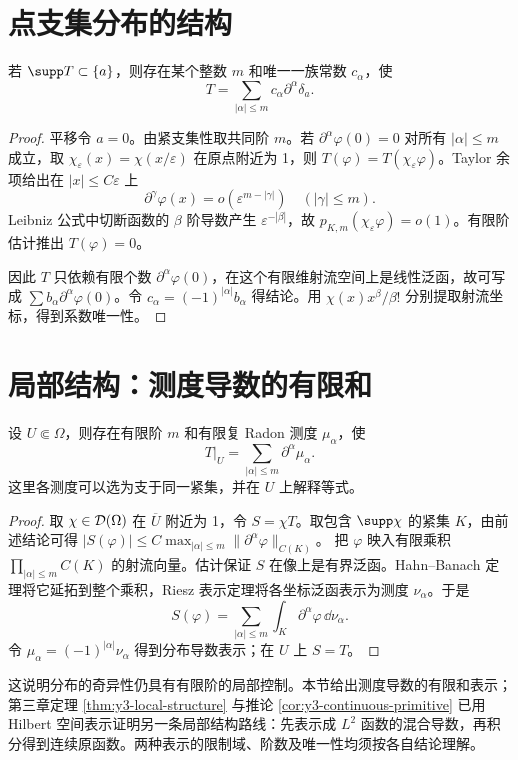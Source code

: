 \section{点支集分布的结构}
\begin{theorem}[有限点射流]\label{thm:point-support}
若 $\supp T\subset\{a\}$，则存在某个整数 $m$ 和唯一一族常数 $c_\alpha$，使
\begin{equation}\label{eq:point-support}
 T=\sum_{|\alpha|\le m}c_\alpha\partial^\alpha\delta_a.
\end{equation}
\end{theorem}
\begin{proof}
平移令 $a=0$。由紧支集性取共同阶 $m$。若 $\partial^\alpha\varphi(0)=0$ 对所有 $|\alpha|\le m$ 成立，取 $\chi_\varepsilon(x)=\chi(x/\varepsilon)$ 在原点附近为 1，则 $T(\varphi)=T(\chi_\varepsilon\varphi)$。Taylor 余项给出在 $|x|\le C\varepsilon$ 上
\[
 \partial^\gamma\varphi(x)=o(\varepsilon^{m-|\gamma|})\quad(|\gamma|\le m).
\]
Leibniz 公式中切断函数的 $\beta$ 阶导数产生 $\varepsilon^{-|\beta|}$，故 $p_{K,m}(\chi_\varepsilon\varphi)=o(1)$。有限阶估计推出 $T(\varphi)=0$。

因此 $T$ 只依赖有限个数 $\partial^\alpha\varphi(0)$，在这个有限维射流空间上是线性泛函，故可写成 $\sum b_\alpha\partial^\alpha\varphi(0)$。令 $c_\alpha=(-1)^{|\alpha|}b_\alpha$ 得结论。用 $\chi(x)x^\beta/\beta!$ 分别提取射流坐标，得到系数唯一性。
\end{proof}

\section{局部结构：测度导数的有限和}
\begin{proposition}[测度表示]\label{prop:measure-structure}
设 $U\Subset\Omega$，则存在有限阶 $m$ 和有限复 Radon 测度 $\mu_\alpha$，使
\[
 T|_U=\sum_{|\alpha|\le m}\partial^\alpha\mu_\alpha.
\]
这里各测度可以选为支于同一紧集，并在 $U$ 上解释等式。
\end{proposition}
\begin{proof}
取 $\chi\in\mathcal{D}(\Omega)$ 在 $\overline U$ 附近为 1，令 $S=\chi T$。取包含 $\supp\chi$ 的紧集 $K$，由前述结论可得
$|S(\varphi)|\le C\max_{|\alpha|\le m}\|\partial^\alpha\varphi\|_{C(K)}$。
把 $\varphi$ 映入有限乘积 $\prod_{|\alpha|\le m}C(K)$ 的射流向量。估计保证 $S$ 在像上是有界泛函。Hahn--Banach 定理将它延拓到整个乘积，Riesz 表示定理将各坐标泛函表示为测度 $\nu_\alpha$。于是
\[
 S(\varphi)=\sum_{|\alpha|\le m}\int_K\partial^\alpha\varphi\,\dd\nu_\alpha.
\]
令 $\mu_\alpha=(-1)^{|\alpha|}\nu_\alpha$ 得到分布导数表示；在 $U$ 上 $S=T$。
\end{proof}
这说明分布的奇异性仍具有有限阶的局部控制。本节给出测度导数的有限和表示；第三章定理 \ref{thm:y3-local-structure} 与推论 \ref{cor:y3-continuous-primitive} 已用 Hilbert 空间表示证明另一条局部结构路线：先表示成 $L^2$ 函数的混合导数，再积分得到连续原函数。两种表示的限制域、阶数及唯一性均须按各自结论理解。

